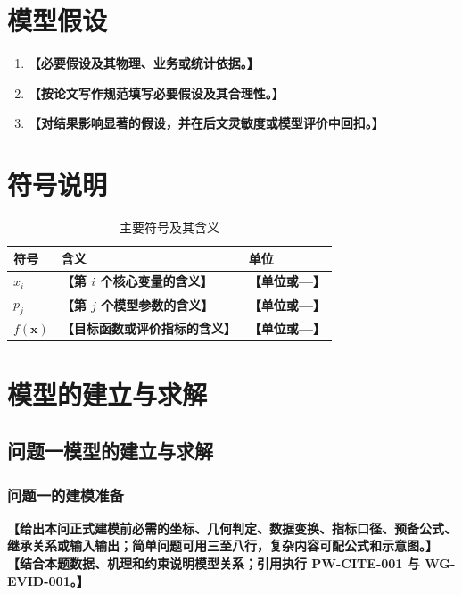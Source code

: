 \documentclass[UTF8,a4paper,12pt,zihao=-4]{ctexart}
\newcommand{\TemplateField}[1]{\textbf{【#1】}}
\begin{document}
\section{模型假设}
\begin{enumerate}[label=\textbf{假设\arabic*.}]
  \item \TemplateField{必要假设及其物理、业务或统计依据。}
  \item \TemplateField{按论文写作规范填写必要假设及其合理性。}
  \item \TemplateField{对结果影响显著的假设，并在后文灵敏度或模型评价中回扣。}
\end{enumerate}

\section{符号说明}
\begin{table}[htbp]
  \centering
  \caption{主要符号及其含义}
  \label{tab:symbols}
  \begin{tabularx}{0.88\textwidth}{>{\centering\arraybackslash}p{}X>{\centering\arraybackslash}p{}}
    \toprule[1.2pt]
    符号 & 含义 & 单位 \\
    \midrule[0.8pt]
    $x_i$ & \TemplateField{第 $i$ 个核心变量的含义} & \TemplateField{单位或—} \\
    $p_j$ & \TemplateField{第 $j$ 个模型参数的含义} & \TemplateField{单位或—} \\
    $f(\symbf{x})$ & \TemplateField{目标函数或评价指标的含义} & \TemplateField{单位或—} \\
    \bottomrule[1.2pt]
  \end{tabularx}
\end{table}

\section{模型的建立与求解}

\subsection{问题一模型的建立与求解}

\subsubsection{问题一的建模准备}
\TemplateField{给出本问正式建模前必需的坐标、几何判定、数据变换、指标口径、预备公式、继承关系或输入输出；简单问题可用三至八行，复杂内容可配公式和示意图。}
\TemplateField{结合本题数据、机理和约束说明模型关系；引用执行 PW-CITE-001 与 WG-EVID-001。}
\end{document}
